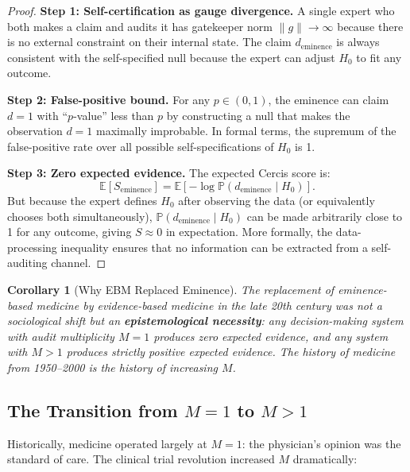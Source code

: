 \documentclass[12pt,a4paper]{article}
\newtheorem{corollary}[theorem]{Corollary}
\theoremstyle{remark}
\newcommand{\E}{\mathbb{E}}
\newcommand{\Pbb}{\mathbb{P}}
\newcommand{\Cercis}{\textsf{Cercis}}
\begin{document}
\begin{proof}
\noindent\textbf{Step 1: Self-certification as gauge divergence.}
A single expert who both makes a claim and audits it has gatekeeper norm
$\|g\| \to \infty$ because there is no external constraint on their
internal state. The claim $d_{\text{eminence}}$ is always consistent with
the self-specified null because the expert can adjust $H_0$ to fit any
outcome.

\smallskip
\noindent\textbf{Step 2: False-positive bound.}
For any $p \in (0, 1)$, the eminence can claim $d=1$ with ``$p$-value''
less than $p$ by constructing a null that makes the observation
$d=1$ maximally improbable. In formal terms, the supremum of the
false-positive rate over all possible self-specifications of $H_0$ is 1.

\smallskip
\noindent\textbf{Step 3: Zero expected evidence.}
The expected \Cercis{} score is:
\begin{equation}
  \E[S_{\text{eminence}}] = \E[-\log \Pbb(d_{\text{eminence}} \mid H_0)].
\end{equation}
But because the expert defines $H_0$ after observing the data (or equivalently
chooses both simultaneously), $\Pbb(d_{\text{eminence}} \mid H_0)$ can be
made arbitrarily close to 1 for any outcome, giving $S \approx 0$ in
expectation. More formally, the data-processing inequality ensures that
no information can be extracted from a self-auditing channel.
\end{proof}

\begin{corollary}[Why EBM Replaced Eminence]
\label{cor:ebm_replaced}
The replacement of eminence-based medicine by evidence-based medicine in
the late 20th century was not a sociological shift but an
\textbf{epistemological necessity}: any decision-making system with
audit multiplicity $M=1$ produces zero expected evidence, and any system
with $M>1$ produces strictly positive expected evidence. The history of
medicine from 1950--2000 is the history of increasing $M$.
\end{corollary}

\subsection{The Transition from $M=1$ to $M>1$}

Historically, medicine operated largely at $M=1$: the physician's opinion
was the standard of care. The clinical trial revolution increased $M$
dramatically:
\end{document}
